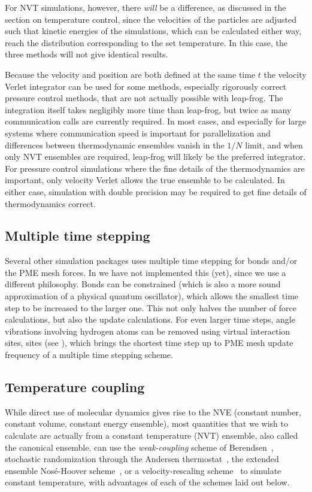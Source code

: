 For NVT simulations, however, there {\em will} be a difference, as
discussed in the section on temperature control, since the velocities
of the particles are adjusted such that kinetic energies of the
simulations, which can be calculated either way, reach the
distribution corresponding to the set temperature.  In this case, the
three methods will not give identical results.

Because the velocity and position are both defined at the same time
$t$ the velocity Verlet integrator can be used for some methods,
especially rigorously correct pressure control methods, that are not
actually possible with leap-frog.  The integration itself takes
negligibly more time than leap-frog, but twice as many communication
calls are currently required.  In most cases, and especially for large
systems where communication speed is important for parallelization and
differences between thermodynamic ensembles vanish in the $1/N$ limit,
and when only NVT ensembles are required, leap-frog will likely be the
preferred integrator.  For pressure control simulations where the fine
details of the thermodynamics are important, only velocity Verlet
allows the true ensemble to be calculated.  In either case, simulation
with double precision may be required to get fine details of
thermodynamics correct.

\subsection{Multiple time stepping}
Several other simulation packages uses multiple time stepping for
bonds and/or the PME mesh forces. In {\gromacs} we have not implemented
this (yet), since we use a different philosophy. Bonds can be constrained
(which is also a more sound approximation of a physical quantum
oscillator), which allows the smallest time step to be increased
to the larger one. This not only halves the number of force calculations,
but also the update calculations. For even larger time steps, angle vibrations
involving hydrogen atoms can be removed using virtual interaction
{sites,}
{sites (see ),}
which brings the shortest time step up to
PME mesh update frequency of a multiple time stepping scheme.

\subsection{Temperature coupling}
While direct use of molecular dynamics gives rise to the NVE (constant
number, constant volume, constant energy ensemble), most quantities
that we wish to calculate are actually from a constant temperature
(NVT) ensemble, also called the canonical ensemble. {\gromacs} can use
the {\em weak-coupling} scheme of Berendsen~\cite{Berendsen84},
stochastic randomization through the Andersen
thermostat~\cite{Andersen80}, the extended ensemble Nos{\'e}-Hoover
scheme~\cite{Nose84,Hoover85}, or a velocity-rescaling
scheme~\cite{Bussi2007a} to simulate constant temperature, with
advantages of each of the schemes laid out below.

